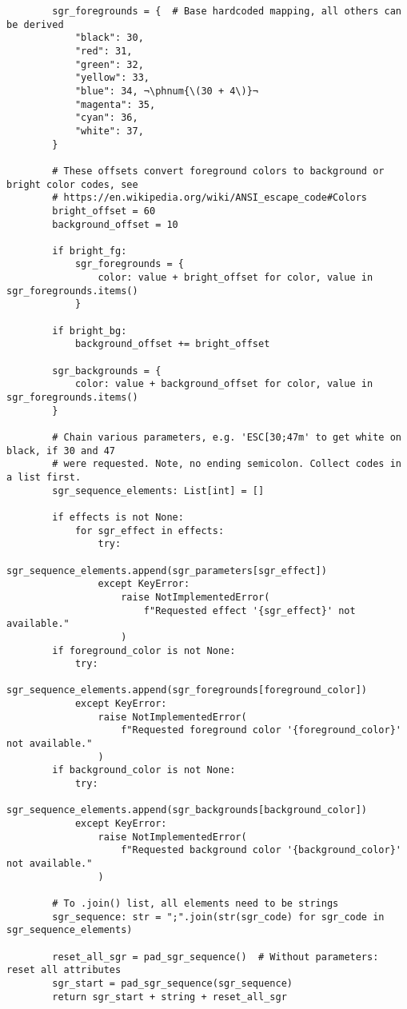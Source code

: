 \begin{verbatim}
        sgr_foregrounds = {  # Base hardcoded mapping, all others can be derived
            "black": 30,
            "red": 31,
            "green": 32,
            "yellow": 33,
            "blue": 34, ¬\phnum{\(30 + 4\)}¬
            "magenta": 35,
            "cyan": 36,
            "white": 37,
        }

        # These offsets convert foreground colors to background or bright color codes, see
        # https://en.wikipedia.org/wiki/ANSI_escape_code#Colors
        bright_offset = 60
        background_offset = 10

        if bright_fg:
            sgr_foregrounds = {
                color: value + bright_offset for color, value in sgr_foregrounds.items()
            }

        if bright_bg:
            background_offset += bright_offset

        sgr_backgrounds = {
            color: value + background_offset for color, value in sgr_foregrounds.items()
        }

        # Chain various parameters, e.g. 'ESC[30;47m' to get white on black, if 30 and 47
        # were requested. Note, no ending semicolon. Collect codes in a list first.
        sgr_sequence_elements: List[int] = []

        if effects is not None:
            for sgr_effect in effects:
                try:
                    sgr_sequence_elements.append(sgr_parameters[sgr_effect])
                except KeyError:
                    raise NotImplementedError(
                        f"Requested effect '{sgr_effect}' not available."
                    )
        if foreground_color is not None:
            try:
                sgr_sequence_elements.append(sgr_foregrounds[foreground_color])
            except KeyError:
                raise NotImplementedError(
                    f"Requested foreground color '{foreground_color}' not available."
                )
        if background_color is not None:
            try:
                sgr_sequence_elements.append(sgr_backgrounds[background_color])
            except KeyError:
                raise NotImplementedError(
                    f"Requested background color '{background_color}' not available."
                )

        # To .join() list, all elements need to be strings
        sgr_sequence: str = ";".join(str(sgr_code) for sgr_code in sgr_sequence_elements)

        reset_all_sgr = pad_sgr_sequence()  # Without parameters: reset all attributes
        sgr_start = pad_sgr_sequence(sgr_sequence)
        return sgr_start + string + reset_all_sgr
\end{verbatim}

